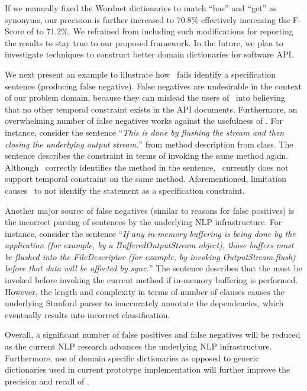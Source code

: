 If we manually fixed the Wordnet dictionaries to match ``has'' and ``get'' as synonyms, our precision is further increased to 70.8\% effectively increasing the F-Score of \tool to 71.2\%. We refrained from including such modifications for reporting the results to stay true to our proposed framework. In the future, we plan to investigate techniques to construct better domain dictionaries for software API.

We next present an example to illustrate how \tool\ fails identify a specification sentence (producing false negative). False negatives are undesirable in the context of our problem domain, because they can mislead the users of \tool\ into believing that no other temporal constraint exists in the API documents. Furthermore, an overwhelming number of false negatives works against the usefulness of \tool. For instance, consider the sentence ``\textit{This is done by flushing the stream and then closing the underlying output stream.}'' from   method description from  class. The sentence describes the constraint in terms of invoking the same method again. Although \tool\ correctly identifies the method  in the sentence, \tool\ currently does not support temporal constraint on the same method. Aforementioned, limitation causes \tool\ to not identify the statement as a specification constraint.   


Another major source of false negatives (similar to reasons for false positives) is the incorrect parsing of sentences by the underlying NLP infrastructure. For instance, consider the sentence ``\textit{If any in-memory buffering is being done by the application (for example, by a BufferedOutputStream object), those buffers must be flushed into the FileDescriptor (for example, by invoking OutputStream.flush) before that data will be affected by sync.}'' The sentence describes that the  must be invoked before invoking the current method if in-memory buffering is performed. However, the length and complexity in terms of number of clauses causes the underlying Stanford parser to inaccurately annotate the dependencies, which eventually results into incorrect classification. 

Overall, a significant number of false positives and false negatives will be reduced as the current NLP research advances the underlying NLP infrastructure. Furthermore, use of domain specific dictionaries as opposed to generic dictionaries used in current prototype implementation will further improve the precision and recall of \tool. 

